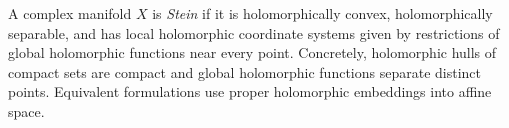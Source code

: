 
A complex manifold $X$ is \emph{Stein} if it is holomorphically convex, holomorphically separable, and has local holomorphic coordinate systems given by restrictions of global holomorphic functions near every point. Concretely, holomorphic hulls of compact sets are compact and global holomorphic functions separate distinct points. Equivalent formulations use proper holomorphic embeddings into affine space.
